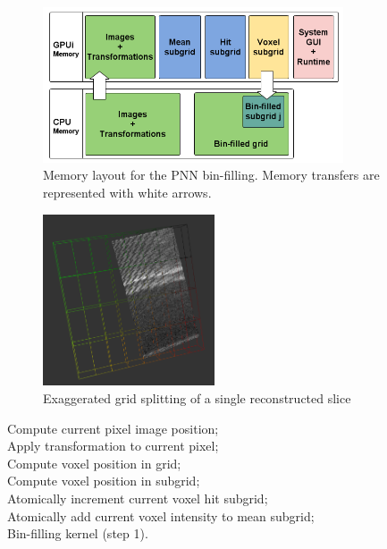 \documentclass[12pt,journal,compsoc]{IEEEtran}
\begin{document}
\begin{figure}[hb!]
\centering
\includegraphics[width=3.5in]{bin_filling_memory}
\caption{Memory layout for the PNN bin-filling. Memory transfers are represented with white arrows.}
\label{bin_filling_memory}
\end{figure}

\begin{figure}[ht!]
\centering
\includegraphics[width=2.0in]{split1}%
\caption{Exaggerated grid splitting of a single reconstructed slice}
\label{mega_grid_splitting}
\end{figure}

\begin{algorithm}
\vspace{0.2cm}
Compute current pixel image position;\\
Apply transformation to current pixel;\\
Compute voxel position in grid;\\
Compute voxel position in subgrid;\\
Atomically increment current voxel hit subgrid;\\
Atomically add current voxel intensity to mean subgrid;\\
\caption{Bin-filling kernel (step 1).}
\label{bin_filling_kernel}
\end{algorithm}
\end{document}
